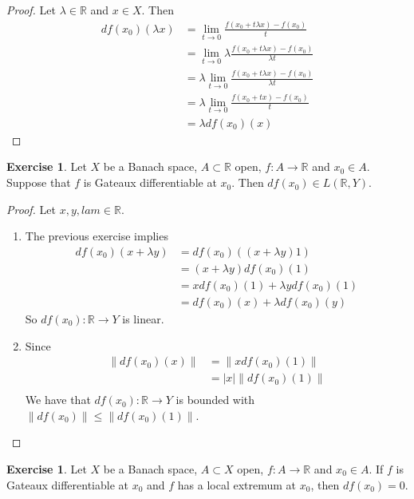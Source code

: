\documentclass[12pt]{amsart}
\theoremstyle{definition}
\theoremstyle{remark}
\theoremstyle{definition}
\newtheorem{ex}[definition]{Exercise}
\newcommand{\lam}{\lambda}
\newcommand{\R}{\mathbb{R}}
\begin{document}
	\begin{proof}
	Let $\lam \in \R$ and $x \in X$. Then 
	\begin{align*}
	df(x_0)(\lam x) 
	&= \lim_{t \rightarrow 0} \frac{f(x_0 + t \lam x) - f(x_0)}{t} \\
	&= \lim_{t \rightarrow 0} \lam \frac{f(x_0 + t \lam x) - f(x_0)}{\lam t} \\
	&= \lam \lim_{t \rightarrow 0}  \frac{f(x_0 + t \lam x) - f(x_0)}{\lam t} \\
	&= \lam \lim_{t \rightarrow 0}  \frac{f(x_0 + t x) - f(x_0)}{t} \\
	&= \lam df(x_0)(x) 
	\end{align*}
	\end{proof}
	
	\begin{ex}
	Let $X$ be a Banach space, $A \subset \R$ open, $f:A \rightarrow \R$ and $x_0 \in A$. Suppose that $f$ is Gateaux differentiable at $x_0$. Then $df(x_0) \in L(\R,Y)$.
	\end{ex}
	
	\begin{proof}
	Let $x,y ,lam \in \R$. 
	\begin{enumerate}
	\item The previous exercise implies 
	\begin{align*}
	df(x_0)(x + \lam y) 
	&= df(x_0)((x+\lam y)1)  \\
	&= (x+\lam y)df(x_0)(1) \\
	&= xdf(x_0)(1) + \lam y df(x_0)(1) \\
	&= df(x_0)(x) + \lam df(x_0)(y)
	\end{align*}
	So $df(x_0):\R \rightarrow Y$ is linear.
	\item Since 
	\begin{align*}
	\|df(x_0)(x)\| 
	&= \|xdf(x_0)(1)\| \\
	&= |x| \|df(x_0)(1)\| \\
	\end{align*}	
	We have that $df(x_0):\R \rightarrow Y$ is bounded with $\|df(x_0)\| \leq \|df(x_0)(1)\|$. 
	\end{enumerate}
	\end{proof}
	
	\begin{ex}
	Let $X$ be a Banach space, $A \subset X$ open, $f:A \rightarrow \R$ and $x_0 \in A$. If $f$ is Gateaux differentiable at $x_0$ and $f$ has a local extremum at $x_0$, then $df(x_0) = 0$.
	\end{ex}	
	
\end{document}
